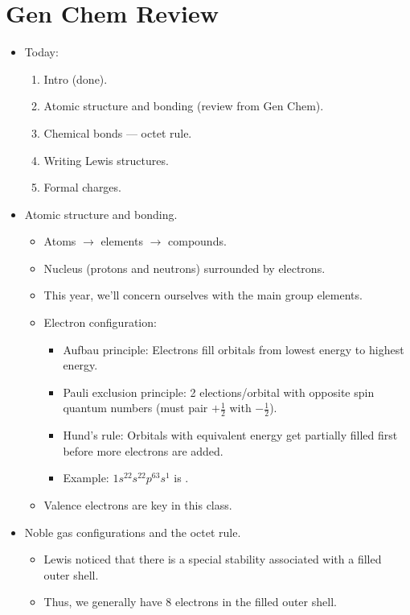 \documentclass[../notes.tex]{subfiles}
\begin{document}
\section{Gen Chem Review}
\begin{itemize}
    \item Today:
    \begin{enumerate}
        \item Intro (done).
        \item Atomic structure and bonding (review from Gen Chem).
        \item Chemical bonds --- octet rule.
        \item Writing Lewis structures.
        \item Formal charges.
    \end{enumerate}
    \item Atomic structure and bonding.
    \begin{itemize}
        \item Atoms $\to$ elements $\to$ compounds.
        \item Nucleus (protons and neutrons) surrounded by electrons.
        \item This year, we'll concern ourselves with the main group elements.
        \item Electron configuration:
        \begin{itemize}
            \item Aufbau principle: Electrons fill orbitals from lowest energy to highest energy.
            \item Pauli exclusion principle: 2 elections/orbital with opposite spin quantum numbers (must pair $+\frac{1}{2}$ with $-\frac{1}{2}$).
            \item Hund's rule: Orbitals with equivalent energy get partially filled first before more electrons are added.
            \item Example: $1s^22s^22p^63s^1$ is .
        \end{itemize}
        \item Valence electrons are key in this class.
    \end{itemize}
    \item Noble gas configurations and the octet rule.
    \begin{itemize}
        \item Lewis noticed that there is a special stability associated with a filled outer shell.
        \item Thus, we generally have 8 electrons in the filled outer shell.

\end{itemize}
\end{itemize}
\end{document}
